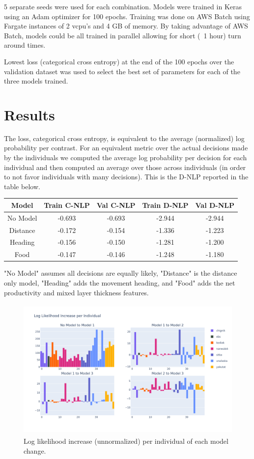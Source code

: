 \documentclass[11pt]{article}
\begin{document}
5 separate seeds were used for each combination. Models were trained in Keras using an Adam optimizer for 100 epochs. Training was done on AWS Batch using Fargate instances of 2 vcpu's and 4 GB of memory. By taking advantage of AWS Batch,  models could be all trained in parallel allowing for short (~1 hour) turn around times. 

Lowest loss (categorical cross entropy) at the end of the 100 epochs over the validation dataset was used to select the best set of parameters for each of the three models trained.



\section*{Results}

The loss, categorical cross entropy, is equivalent to the average (normalized) log probability per contrast. For an equivalent metric over the actual decisions made by the individuals we computed the average log probability per decision for each individual and then computed an average over those across individuals (in order to not favor individuals with many decisions). This is the D-NLP reported in the table below. 

\begin{center}
\begin{tabular}{| c | c | c | c | c |}
\hline 
Model & Train C-NLP & Val C-NLP & Train D-NLP & Val D-NLP \\
\hline
No Model & -0.693 & -0.693 & -2.944 & -2.944 \\
Distance & -0.172 & -0.154 & -1.336 & -1.223 \\
Heading & -0.156 & -0.150 & -1.281 & -1.200 \\
Food & -0.147 & -0.146 & -1.248 & -1.180 \\
\hline
\end{tabular}
\end{center}

"No Model" assumes all decisions are equally likely, "Distance" is the distance only model, "Heading" adds the movement heading, and "Food" adds the net productivity and mixed layer thickness features. \newline

\begin{figure}[h!] 
	\centering
  \includegraphics[height=70mm]{figures/ll_increase.png}
  \caption{Log likelihood increase (unnormalized) per individual of each model change.}
  \label{fig:ll_increase}
\end{figure}
\end{document}
